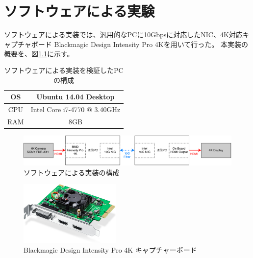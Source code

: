 \chapter{ソフトウェアによる実験}
\label{chap:software-experimentation}

ソフトウェアによる実装では、汎用的なPCに10Gbpsに対応したNIC、4K対応キャプチャボード Blackmagic Design Intensity Pro 4Kを用いて行った。
本実装の概要を、図\ref{fig:software-implement-flow}に示す。

\begin{table}[htbp]
  \caption{ソフトウェアによる実装を検証したPCの構成}
  \label{tb:software-specification}
  \begin{center}
  \begin{tabular}{c||c}
    \hline
    OS  & Ubuntu 14.04 Desktop \\\hline
    CPU & Intel Core i7-4770 @ 3.40GHz \\\hline
    RAM & 8GB                  \\\hline
  \end{tabular}\end{center}
\end{table}

\begin{figure}[htbp]
  \begin{center}
    \includegraphics[bb=0 0 841 121,width=15.5cm]{img/software-implement-flow.pdf}
  \end{center}
  \caption{ソフトウェアによる実装の構成}
  \label{fig:software-implement-flow}
\end{figure}

\begin{figure}[htbp]
  \begin{center}
    \includegraphics[bb=0 0 644 410,width=5cm]{img/bmd-intensity-pro-4k.jpg}
  \end{center}
  \caption{Blackmagic Design Intensity Pro 4K キャプチャーボード}
  \label{fig:ted-4k-fmc-card}
\end{figure}

